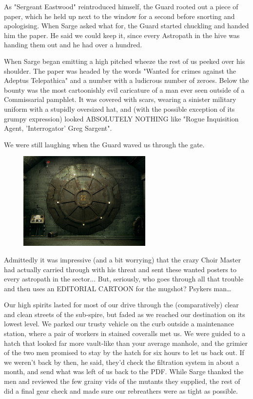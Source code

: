 As "Sergeant Eastwood" reintroduced himself, the Guard rooted out a piece of paper, which he held up next to the window for a second before snorting and apologising. 
When Sarge asked what for, the Guard started chuckling and handed him the paper. 
He said we could keep it, since every Astropath in the hive was handing them out and he had over a hundred.

When Sarge began emitting a high pitched wheeze the rest of us peeked over his shoulder. 
The paper was headed by the words "Wanted for crimes against the Adeptus Telepathica" and a number with a ludicrous number of zeroes. 
Below the bounty was the most cartoonishly evil caricature of a man ever seen outside of a Commissarial pamphlet. 
It was covered with scars, wearing a sinister military uniform with a stupidly oversized hat, and (with the possible exception of its grumpy expression) looked ABSOLUTELY NOTHING like "Rogue Inquisition Agent, 'Interrogator' Greg Sargent". 


We were still laughing when the Guard waved us through the gate.

\begin{figure}
	\begin{center}
		\includegraphics[width=\figwidth]{pics/18/3.png}
	\end{center}
\end{figure}
Admittedly it was impressive (and a bit worrying) that the crazy Choir Master had actually carried through with his threat and sent these wanted posters to every astropath in the sector... 
But, seriously, who goes through all that trouble and then uses an EDITORIAL CARTOON for the mugshot? 
Psykers man…

Our high spirits lasted for most of our drive through the (comparatively) clear and clean streets of the sub-spire, but faded as we reached our destination on its lowest level. 
We parked our trusty vehicle on the curb outside a maintenance station, where a pair of workers in stained coveralls met us. 
We were guided to a hatch that looked far more vault-like than your average manhole, and the grimier of the two  men promised to stay by the hatch for six hours to let us back out. 
If we weren't back by then, he said, they'd check the filtration system in about a month, and send what was left of us back to the PDF. 
While Sarge thanked the men and reviewed the few grainy vids of the mutants they supplied, the rest of did a final gear check and made sure our rebreathers were as tight as possible. 


